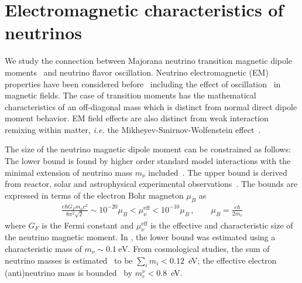 \section{Electromagnetic characteristics of neutrinos}
\label{sec:numoment}
We study the connection between Majorana neutrino transition magnetic dipole moments~\citep{Fujikawa:1980yx,Shrock:1980vy,Shrock:1982sc} and neutrino flavor oscillation. Neutrino electromagnetic (EM) properties have been considered before~\citep{Schechter:1981hw,Giunti:2014ixa,Popov:2019nkr,Chukhnova:2019oum} including the effect of oscillation~\citep{Lim:1987tk,Akhmedov:1988uk,Pal:1991pm,Elizalde:2004mw,Akhmedov:2022txm} in magnetic fields. The case of transition moments has the mathematical characteristics of an off-diagonal mass which is distinct from normal direct dipole moment behavior. EM field effects are also distinct from weak interaction remixing within matter, {\it i.e.\/} the Mikheyev-Smirnov-Wolfenstein effect~\citep{Wolfenstein:1977ue,Mikheyev:1985zog,Smirnov:2003da}.




The size of the neutrino magnetic dipole moment can be constrained as follows: The lower bound is found by higher order standard model interactions with the minimal extension of neutrino mass $m_{\nu}$ included~\citep{Fujikawa:1980yx,Shrock:1980vy,Shrock:1982sc}. The upper bound is derived from reactor, solar and astrophysical experimental observations~\citep{Giunti:2015gga,Canas:2015yoa,Studenikin:2016ykv,AristizabalSierra:2021fuc}. The bounds are expressed in terms of the electron Bohr magneton $\mu_{B}$ as
\begin{align}
    \label{bound:1}
    \frac{e\hbar G_{F}m_{\nu}c^{2}}{8\pi^{2}\sqrt{2}} \sim 10^{-20}\mu_{B}<\mu_{\nu}^\mathrm{eff}<10^{-10}\mu_{B}\,,\qquad\mu_{B}=\frac{e\hbar}{2m_{e}}
\end{align}
where $G_{F}$ is the Fermi constant and $\mu_{\nu}^\mathrm{eff}$ is the effective and characteristic size of the neutrino magnetic moment. In , the lower bound was estimated using a characteristic mass of $m_{\nu}\sim0.1~\mathrm{eV}$. From cosmological studies, the sum of neutrino masses is estimated~\citep{Planck:2018vyg} to be $\sum_{i}m_{i}<0.12$~eV; the effective electron (anti)neutrino mass is bounded~\citep{KATRIN:2021uub} by $m_{e}^{\nu}<0.8$~eV.

